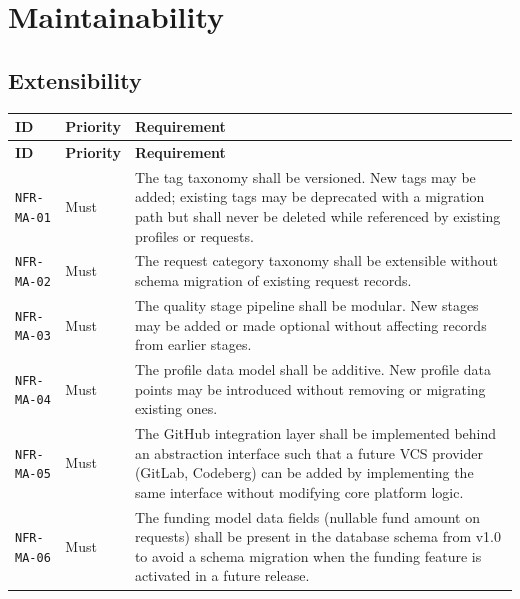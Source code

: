 \documentclass[12pt,a4paper]{article}
\begin{document}
\section{Maintainability}

\subsection{Extensibility}
\begin{longtable}{L{2.2cm} L{1.8cm} L{9.3cm}}
  \color{white}\bfseries ID & \color{white}\bfseries Priority & \color{white}\bfseries Requirement \\
  \endfirsthead
  \color{white}\bfseries ID & \color{white}\bfseries Priority & \color{white}\bfseries Requirement \\
  \endhead\hline
  \texttt{NFR-MA-01} & Must   & The tag taxonomy shall be versioned. New tags may be added; existing tags may be deprecated with a migration path but shall never be deleted while referenced by existing profiles or requests. \\
  \texttt{NFR-MA-02} & Must   & The request category taxonomy shall be extensible without schema migration of existing request records. \\
  \texttt{NFR-MA-03} & Must   & The quality stage pipeline shall be modular. New stages may be added or made optional without affecting records from earlier stages. \\
  \texttt{NFR-MA-04} & Must   & The profile data model shall be additive. New profile data points may be introduced without removing or migrating existing ones. \\
  \texttt{NFR-MA-05} & Must   & The GitHub integration layer shall be implemented behind an abstraction interface such that a future VCS provider (GitLab, Codeberg) can be added by implementing the same interface without modifying core platform logic. \\
  \texttt{NFR-MA-06} & Must   & The funding model data fields (nullable fund amount on requests) shall be present in the database schema from v1.0 to avoid a schema migration when the funding feature is activated in a future release. \\
  \hline
\end{longtable}
\end{document}
